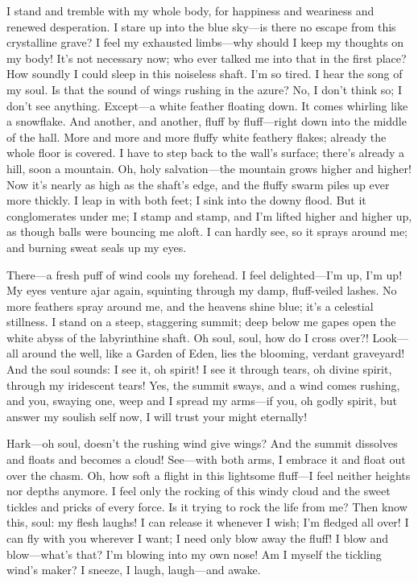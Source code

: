 \documentclass[12pt,a4paper]{article}
\begin{document}
I stand and tremble with my whole body, for happiness and weariness and renewed desperation. I stare up into the blue sky—is there no escape from this crystalline grave? I feel my exhausted limbs—why should I keep my thoughts on my body! It’s not necessary now; who ever talked me into that in the first place? How soundly I could sleep in this noiseless shaft. I’m so tired. I hear the song of my soul. Is that the sound of wings rushing in the azure? No, I don’t think so; I don’t see anything. Except—a white feather floating down. It comes whirling like a snowflake. And another, and another, fluff by fluff—right down into the middle of the hall. More and more and more fluffy white feathery flakes; already the whole floor is covered. I have to step back to the wall’s surface; there’s already a hill, soon a mountain. Oh, holy salvation—the mountain grows higher and higher! Now it’s nearly as high as the shaft’s edge, and the fluffy swarm piles up ever more thickly. I leap in with both feet; I sink into the downy flood. But it conglomerates under me; I stamp and stamp, and I’m lifted higher and higher up, as though balls were bouncing me aloft. I can hardly see, so it sprays around me; and burning sweat seals up my eyes.

There—a fresh puff of wind cools my forehead. I feel delighted—I’m up, I’m up! My eyes venture ajar again, squinting through my damp, fluff-veiled lashes. No more feathers spray around me, and the heavens shine blue; it’s a celestial stillness. I stand on a steep, staggering summit; deep below me gapes open the white abyss of the labyrinthine shaft. Oh soul, soul, how do I cross over?! Look—all around the well, like a Garden of Eden, lies the blooming, verdant graveyard! And the soul sounds: I see it, oh spirit! I see it through tears, oh divine spirit, through my iridescent tears! Yes, the summit sways, and a wind comes rushing, and you, swaying one, weep and I spread my arms—if you, oh godly spirit, but answer my soulish self now, I will trust your might eternally!

Hark—oh soul, doesn’t the rushing wind give wings? And the summit dissolves and floats and becomes a cloud! See—with both arms, I embrace it and float out over the chasm. Oh, how soft a flight in this lightsome fluff—I feel neither heights nor depths anymore. I feel only the rocking of this windy cloud and the sweet tickles and pricks of every force. Is it trying to rock the life from me? Then know this, soul: my flesh laughs! I can release it whenever I wish; I’m fledged all over! I can fly with you wherever I want; I need only blow away the fluff! I blow and blow—what’s that? I’m blowing into my own nose! Am I myself the tickling wind’s maker? I sneeze, I laugh, laugh—and awake.
\end{document}

